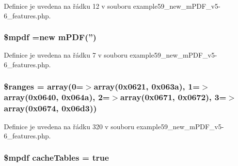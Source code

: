 Definice je uvedena na řádku 12 v souboru example59\-\_\-new\-\_\-m\-P\-D\-F\-\_\-v5-\/6\-\_\-features.\-php.

\hypertarget{example59__new__m_p_d_f__v5-6__features_8php_ad028f81910d6cbab9b184d2214b3a8f8}{
\subsubsection[{\$mpdf}]{\setlength{\rightskip}{0pt plus 5cm}\$mpdf =new {\bf m\-P\-D\-F}('')}}\label{example59__new__m_p_d_f__v5-6__features_8php_ad028f81910d6cbab9b184d2214b3a8f8}


Definice je uvedena na řádku 7 v souboru example59\-\_\-new\-\_\-m\-P\-D\-F\-\_\-v5-\/6\-\_\-features.\-php.

\hypertarget{example59__new__m_p_d_f__v5-6__features_8php_a48d8618605882fed58f79aecd7d06d5a}{
\subsubsection[{\$ranges}]{\setlength{\rightskip}{0pt plus 5cm}\$ranges = array(0=$>$array(0x0621, 0x063a), 1=$>$array(0x0640, 0x064a), 2=$>$array(0x0671, 0x0672), 3=$>$array(0x0674, 0x06d3))}}\label{example59__new__m_p_d_f__v5-6__features_8php_a48d8618605882fed58f79aecd7d06d5a}


Definice je uvedena na řádku 320 v souboru example59\-\_\-new\-\_\-m\-P\-D\-F\-\_\-v5-\/6\-\_\-features.\-php.

\hypertarget{example59__new__m_p_d_f__v5-6__features_8php_a481460886a3bc9dd04ebf14a7d7ddcc1}{
\subsubsection[{cache\-Tables}]{\setlength{\rightskip}{0pt plus 5cm}\$mpdf cache\-Tables = true}}\label{example59__new__m_p_d_f__v5-6__features_8php_a481460886a3bc9dd04ebf14a7d7ddcc1}


